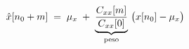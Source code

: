 \documentclass[preview]{standalone}
\begin{document}
\begin{align*}
\special{dvisvgm:raw <g id='unique000'>}\hat x[n_0+m] \;=\; \mu_x \;+\; \underbrace{\frac{C_{xx}[m]}{C_{xx}[0]}}_{\text{peso}}\,\big(x[n_0]-\mu_x\big)\special{dvisvgm:raw </g>}
\end{align*}
\end{document}
